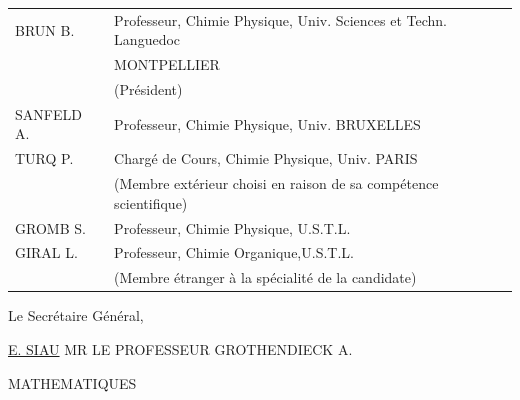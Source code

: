 \begin{tabular}{lp{.74\linewidth}}
BRUN B. & Professeur, Chimie Physique, Univ. Sciences et Techn. Languedoc\\
& MONTPELLIER\\
& (Président)\\
SANFELD A. & Professeur, Chimie Physique, Univ. BRUXELLES\\
TURQ P. & Chargé de Cours, Chimie Physique, Univ. PARIS\\
& (Membre extérieur choisi en raison de sa compétence scientifique)\\
GROMB S. & Professeur, Chimie Physique, U.S.T.L.\\
GIRAL L. & Professeur, Chimie Organique,U.S.T.L.\\
& (Membre étranger à la spécialité de la candidate)
\end{tabular}
Le Secrétaire Général,


\uline{E. SIAU}
MR LE PROFESSEUR GROTHENDIECK A.

MATHEMATIQUES
